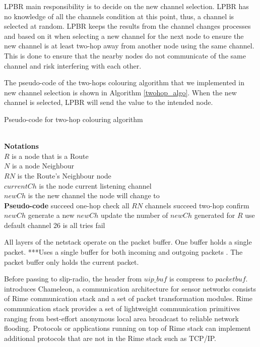 
LPBR main responsibility is to decide on the new channel selection. LPBR has no knowledge of all the channels condition at this point, thus, a channel is selected at random. LPBR keeps the results from the channel changes processes and based on it when selecting a new channel for the next node to ensure the new channel is at least two-hop away from another node using the same channel. This is done to ensure that the nearby nodes do not communicate of the same channel and risk interfering with each other.

The pseudo-code of the two-hops colouring algorithm that we implemented in new channel selection is shown in Algorithm \ref{twohop_algo}. When the new channel is selected, LPBR will send the value to the intended node.

\begin{algorithm}
\caption{Pseudo-code for two-hop colouring algorithm}
\label{twohop_algo}
\begin{algorithmic}[]
\\\textbf{Notations}
\\$R$ is a node that is a Route
\\$N$ is a node Neighbour
\\$RN$ is the Route's Neighbour node
\\$currentCh$ is the node current listening channel
\\$newCh$ is the new channel the node will change to
\\\textbf{Pseudo-code}
		\State succeed one-hop
		\State check all $RN$ channels
			\State succeed two-hop
			\State confirm $newCh$
		\EndIf
	\Else
		\State generate a new $newCh$
		\State update the number of $newCh$ generated for $R$
		\State use default channel 26 is all tries fail
	\EndIf
\end{algorithmic}
\end{algorithm}

All layers of the netstack operate on the packet buffer. One buffer holds a single packet. ***Uses a single buffer for both incoming and outgoing packets \cite{uip, rime, rimeposter, contiki}. The packet buffer only holds the current packet.

Before passing to slip-radio, the header from $uip\_buf$ is compress to $packetbuf$.  
\cite{rime} introduces Chameleon, a communication architecture for sensor networks consists of Rime communication stack and a set of packet transformation modules. Rime communication stack provides a set of lightweight communication primitives ranging from best-effort anonymous local area broadcast to reliable network flooding. Protocols or applications running on top of Rime stack can implement additional protocols that are not in the Rime stack such as TCP/IP.

